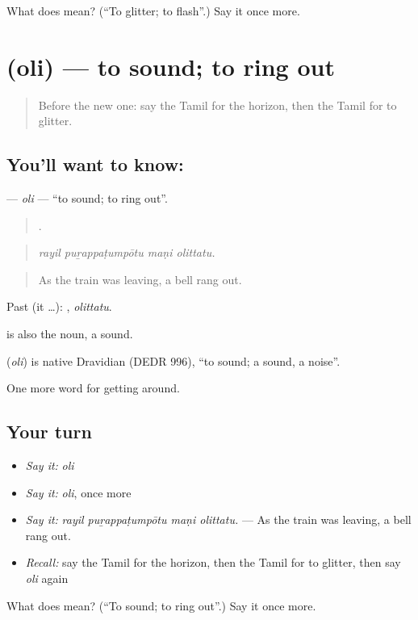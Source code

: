 \begin{tcolorbox}[breakable,colback=teal!4,colframe=teal!35!black,title={Before you move on}]
What does  mean? (\textquotedblleft{}To glitter; to flash\textquotedblright{}.) Say it once more.
\end{tcolorbox}
\section[\texorpdfstring{\ta{ஒலி} (oli)}{ஒலி (oli)}]{ (oli) — to sound; to ring out}

\label{lesson:TA-C430-oli}



\begin{quote}
Before the new one: say the Tamil for the horizon, then the Tamil for to glitter.
\end{quote}

\subsection*{You'll want to know: }
\textbf{} — \emph{oli} — \textquotedblleft{}to sound; to ring out\textquotedblright{}.

\begin{quote}
   .
\end{quote}

\begin{quote}
\emph{rayil puṟappaṭumpōtu maṇi olittatu.}
\end{quote}

\begin{quote}
As the train was leaving, a bell rang out.
\end{quote}

Past (it …): , \emph{olittatu}.

 is also the noun, a sound.

\begin{cousinweb}
\textbf{} (\emph{oli}) is native Dravidian (DEDR 996), \textquotedblleft{}to sound; a sound, a noise\textquotedblright{}.
\end{cousinweb}

\begin{grammarlens}[title={What you've built}]
One more word for getting around.
\end{grammarlens}

\subsection*{Your turn}
\begin{itemize}
\raggedright
  \item \emph{Say it:} \emph{oli}
  \item \emph{Say it:} \emph{oli}, once more
  \item \emph{Say it:} \emph{rayil puṟappaṭumpōtu maṇi olittatu.} — As the train was leaving, a bell rang out.
  \item \emph{Recall:} say the Tamil for the horizon, then the Tamil for to glitter, then say \emph{oli} again
\end{itemize}

\begin{tcolorbox}[breakable,colback=teal!4,colframe=teal!35!black,title={Before you move on}]
What does  mean? (\textquotedblleft{}To sound; to ring out\textquotedblright{}.) Say it once more.
\end{tcolorbox}
